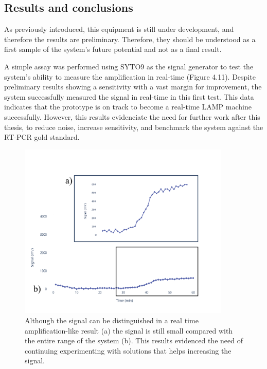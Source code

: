 \newpage

\newpage
\subsection{Results and conclusions}
As previously introduced, this equipment is still under development, and therefore the results are preliminary. Therefore, they should be understood as a first sample of the system's future potential and not as a final result. 

A simple assay was performed using SYTO9 as the signal generator to test the system's ability to measure the amplification in real-time (Figure 4.11). Despite preliminary results showing a sensitivity with a vast margin for improvement, the system successfully measured the signal in real-time in this first test. This data indicates that the prototype is on track to become a real-time LAMP machine successfully. However, this results evidenciate the need for further work after this thesis, to reduce noise, increase sensitivity, and benchmark the system against the RT-PCR gold standard.   

\begin{figure}[b]
    \centering
    \includegraphics[width=0.9\textwidth]{figures/signal.png}
    \caption{Although the signal can be distinguished in a real time amplification-like result (a) the signal is still small compared with the entire range of the system (b). This results evidenced the need of continuing experimenting with solutions that helps increasing the signal.}
    \label{qLAMP signal}
\end{figure}

